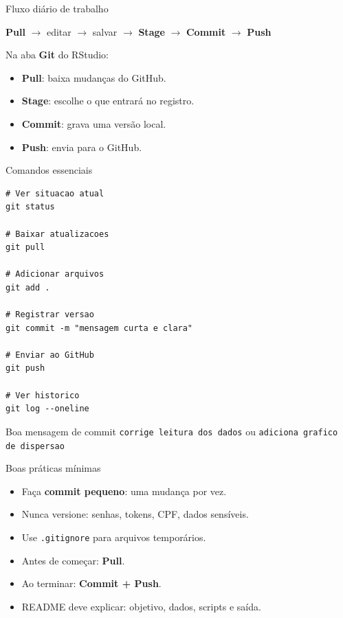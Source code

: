 \documentclass[10pt,aspectratio=169]{beamer}
\begin{document}
\begin{frame}{Fluxo diário de trabalho}
\Large
\begin{center}
\textbf{Pull} $\rightarrow$ editar $\rightarrow$ salvar $\rightarrow$ \textbf{Stage} $\rightarrow$ \textbf{Commit} $\rightarrow$ \textbf{Push}
\end{center}

\vspace{0.4cm}
\large
Na aba \textbf{Git} do RStudio:

\vspace{0.2cm}
\begin{itemize}
  \item \textbf{Pull}: baixa mudanças do GitHub.
  \item \textbf{Stage}: escolhe o que entrará no registro.
  \item \textbf{Commit}: grava uma versão local.
  \item \textbf{Push}: envia para o GitHub.
\end{itemize}
\end{frame}

\begin{frame}[fragile]{Comandos essenciais}
\begin{lstlisting}
# Ver situacao atual
git status

# Baixar atualizacoes
git pull

# Adicionar arquivos
git add .

# Registrar versao
git commit -m "mensagem curta e clara"

# Enviar ao GitHub
git push

# Ver historico
git log --oneline
\end{lstlisting}

\vspace{0.1cm}
\begin{block}{Boa mensagem de commit}
\texttt{corrige leitura dos dados} \quad ou \quad \texttt{adiciona grafico de dispersao}
\end{block}
\end{frame}

\begin{frame}{Boas práticas mínimas}
\large
\begin{itemize}
  \item Faça \textbf{commit pequeno}: uma mudança por vez.
  \item Nunca versione: senhas, tokens, CPF, dados sensíveis.
  \item Use \texttt{.gitignore} para arquivos temporários.
  \item Antes de começar: \textbf{Pull}.
  \item Ao terminar: \textbf{Commit + Push}.
  \item README deve explicar: objetivo, dados, scripts e saída.
\end{itemize}
\end{frame}
\end{document}
